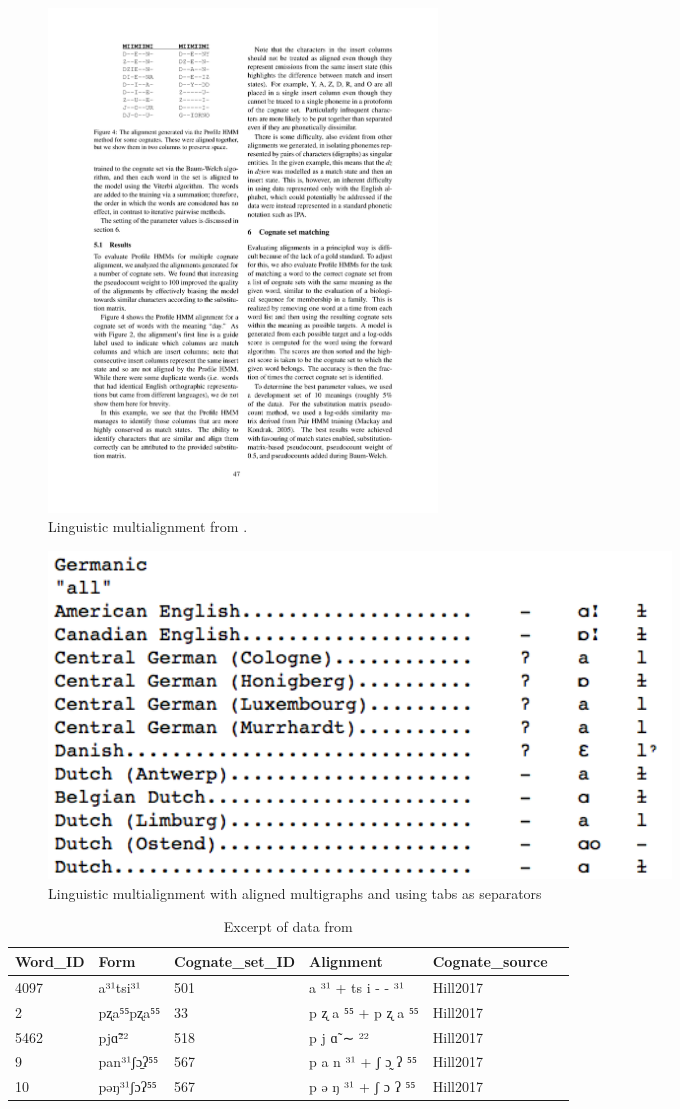 \documentclass[11pt]{article}
\begin{document}
\begin{figure}[htbp]
  \centering
  \includegraphics[width=0.5\textwidth]{images/multialign_bhargava.pdf}
  \caption{Linguistic multialignment from \textcite[47]{bhargava2009}.}
  \label{fig:multialign_bhargava}
\end{figure}

\begin{figure}[htbp]
  \centering
  \includegraphics[width=0.8\textwidth]{images/multialign_list.png}
  \caption{Linguistic multialignment with aligned multigraphs and using tabs as separators \parencite{list2014benchmark}}
  \label{fig:multialign_list}
\end{figure}

\begin{table}[htp]
\begin{center}
\begin{tabular}{llllll} \hline
 Word\_ID & Form & Cognate\_set\_ID & Alignment & Cognate\_source \\ \hline
 4097 & a³¹tsi³¹ & 501 & a ³¹ + ts i - - ³¹ & Hill2017 \\
 2 & pʐa⁵⁵pʐa⁵⁵ & 33 & p ʐ a ⁵⁵ + p ʐ a ⁵⁵ & Hill2017 \\ 
 5462 & pjɑ̃²² & 518 & p j ɑ̃ ∼ ²² & Hill2017 \\ 
 9 & pan³¹ʃɔ̱ʔ⁵⁵ & 567 & p a n ³¹ + ʃ ɔ̰ ʔ ⁵⁵ & Hill2017 \\ 
 10 & pəŋ³¹ʃɔʔ⁵⁵ & 567 & p ə ŋ ³¹ + ʃ ɔ ʔ ⁵⁵ & Hill2017 \\ \hline
\end{tabular}
\end{center}
\caption{Excerpt of data from \textcite{hill2017}}
\label{tab:data_hill}
\end{table}
\end{document}
